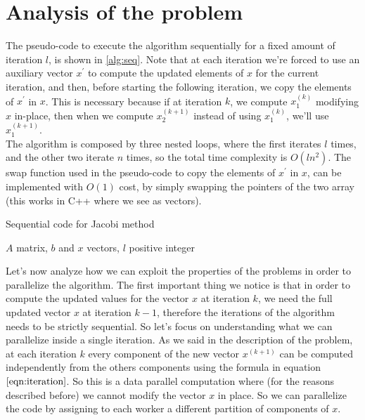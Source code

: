\documentclass[12pt]{article}
\begin{document}
	\section{Analysis of the problem}
	The pseudo-code to execute the algorithm sequentially for a fixed amount of iteration $l$, is shown in \ref{alg:seq}. Note that at each iteration we're forced to use an auxiliary vector $x^\prime$ to compute the updated elements of $x$ for the current iteration, and then, before starting the following iteration, we copy the elements of $x^\prime$ in $x$. This is necessary because if at iteration $k$, we compute $x^{(k)}_1$ modifying $x$ in-place, then when we compute $x^{(k+1)}_2$ instead of using $x^{(k)}_1$, we'll use $x^{(k+1)}_1$.\\ The algorithm is composed by three nested loops, where the first iterates $l$ times, and the other two iterate $n$ times, so the total time complexity is $O(ln^2)$. The swap function used in the pseudo-code to copy the elements of $x^\prime$ in $x$, can be implemented with $O(1)$ cost, by simply swapping the pointers of the two array (this works in C++ where we see as vectors).
	\begin{algorithm}[H]
		\caption{Sequential code for Jacobi method}\label{alg:seq}
		\begin{algorithmic}[1]
			\Require $A$ matrix, $b$ and $x$ vectors, $l$ positive integer
			\EndIf
			\EndFor
			\EndFor
			\EndFor
		\end{algorithmic}
	\end{algorithm}
	Let's now analyze how we can exploit the properties of the problems in order to parallelize the algorithm. The first important thing we notice is that in order to compute the updated values for the vector $x$ at iteration $k$, we need the full updated vector $x$ at iteration $k-1$, therefore the iterations of the algorithm needs to be strictly sequential. So let's focus on understanding what we can parallelize inside a single iteration. As we said in the description of the problem, at each iteration $k$ every component of the new vector $x^{(k+1)}$ can be computed independently from the others components using the formula in equation $\ref{eqn:iteration}$. So this is a data parallel computation where (for the reasons described before) we cannot modify the vector $x$ in place. So we can parallelize the code by assigning to each worker a different partition of components of $x$. \\
\end{document}
